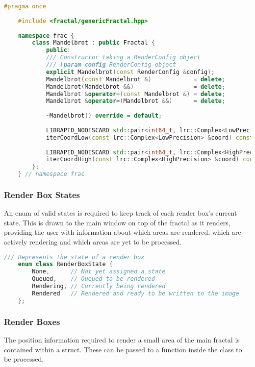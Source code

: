 \begin{lstlisting}[language=c++]
	#pragma once
	
	#include <fractal/genericFractal.hpp>
	
	namespace frac {
		class Mandelbrot : public Fractal {
			public:
			/// Constructor taking a RenderConfig object
			/// \param config RenderConfig object
			explicit Mandelbrot(const RenderConfig &config);
			Mandelbrot(const Mandelbrot &)			  = delete;
			Mandelbrot(Mandelbrot &&)				  = delete;
			Mandelbrot &operator=(const Mandelbrot &) = delete;
			Mandelbrot &operator=(Mandelbrot &&)	  = delete;
			
			~Mandelbrot() override = default;
			
			LIBRAPID_NODISCARD std::pair<int64_t, lrc::Complex<LowPrecision>>
			iterCoordLow(const lrc::Complex<LowPrecision> &coord) const override;
			
			LIBRAPID_NODISCARD std::pair<int64_t, lrc::Complex<HighPrecision>>
			iterCoordHigh(const lrc::Complex<HighPrecision> &coord) const override;
		};
	} // namespace frac
\end{lstlisting}

\subsubsection{Render Box States}

An enum of valid states is required to keep track of each render box's current state. This is drawn to the main window on top of the fractal as it renders, providing the user with information about which areas are rendered, which are actively rendering and which areas are yet to be processed.

\begin{lstlisting}[language=c++]
	/// Represents the state of a render box
	enum class RenderBoxState {
		None,	   // Not yet assigned a state
		Queued,	   // Queued to be rendered
		Rendering, // Currently being rendered
		Rendered   // Rendered and ready to be written to the image
	};
\end{lstlisting}

\subsubsection{Render Boxes}

The position information required to render a small area of the main fractal is contained within a  struct. These can be passed to a function inside the  class to be processed. 

